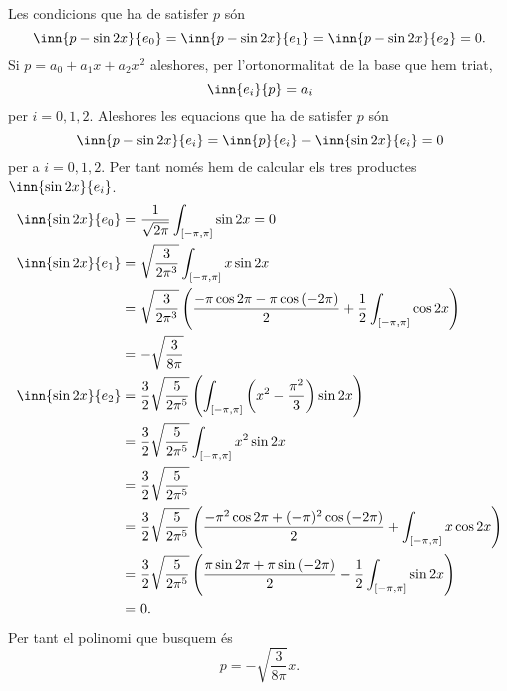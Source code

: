 \documentclass[12pt]{article}
\begin{document}
Les condicions que ha de satisfer \( p \) són
\begin{equation*}
	\inn{p - \sin{2x}}{e_0} = \inn{p - \sin{2x}}{e_1} = \inn{p - \sin{2x}}{e_2} = 0.
\end{equation*}
Si \( p = a_0 + a_1x + a_2x^2 \) aleshores, per l'ortonormalitat de la base que hem triat,
\begin{equation*}
	\inn{e_i}{p} = a_i
\end{equation*}
per \( i = 0,1,2 \). Aleshores les equacions que ha de satisfer \( p \) són
\begin{equation*}
	\inn{p - \sin{2x}}{e_i} = \inn{p}{e_i} - \inn{\sin{2x}}{e_i} = 0
\end{equation*}
per a \( i = 0,1,2 \). Per tant només hem de calcular els tres productes \(
\inn{\sin{2x}}{e_i} \).
\begin{align*}
	\inn{\sin{2x}}{e_0} & = \frac{1}{\sqrt{2\pi}} \int_{[-\pi,\pi]} \sin{2x} = 0 \\
	\inn{\sin{2x}}{e_1} & = \sqrt{\frac{3}{2\pi^3}} \int_{[-\pi,\pi]} x\sin{2x} \\
											& = \sqrt{\frac{3}{2\pi^3}}\left(\frac{-\pi\cos{2\pi} - \pi
											\cos{(-2\pi)}}{2} + \frac{1}{2}\int_{[-\pi,\pi]}\cos{2x} \right) \\
											& = -\sqrt{\frac{3}{8\pi}} \\
	\inn{\sin{2x}}{e_2} & = \frac{3}{2} \sqrt{\frac{5}{2\pi^5}}\left(\int_{[-\pi,\pi]}\left(x^2 -
	\frac{\pi^2}{3}\right)\sin{2x}\right) \\
											& = \frac{3}{2} \sqrt{\frac{5}{2\pi^5}} \int_{[-\pi,\pi]}
											x^2\sin{2x} \\
											& = \frac{3}{2} \sqrt{\frac{5}{2\pi^5}} \\
											& = \frac{3}{2} \sqrt{\frac{5}{2\pi^5}} \left(\frac{-\pi^2 \cos{2\pi} +
											(-\pi)^2 \cos{(-2\pi)}}{2} + \int_{[-\pi,\pi]} x\cos{2x} \right)
											\\
											& = \frac{3}{2} \sqrt{\frac{5}{2\pi^5}} \left(\frac{\pi \sin{2\pi} + \pi
											\sin{(-2\pi)}}{2} - \frac{1}{2}\int_{[-\pi, \pi]} \sin{2x} \right)
											\\
											& = 0.
\end{align*}
Per tant el polinomi que busquem és
\begin{equation*}
	p = -\sqrt{\frac{3}{8\pi}}x.
\end{equation*}
\end{document}
